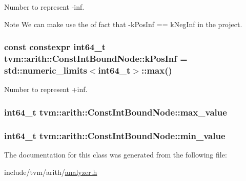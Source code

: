 Number to represent -\/inf. 

\begin{DoxyNote}{Note}
We can make use the of fact that -\/k\+Pos\+Inf == k\+Neg\+Inf in the project. 
\end{DoxyNote}
\subsubsection[{\texorpdfstring{k\+Pos\+Inf}{kPosInf}}]{\setlength{\rightskip}{0pt plus 5cm}const constexpr int64\+\_\+t tvm\+::arith\+::\+Const\+Int\+Bound\+Node\+::k\+Pos\+Inf = std\+::numeric\+\_\+limits$<$int64\+\_\+t$>$\+::{\bf max}()\hspace{0.3cm}{\ttfamily [static]}}\hypertarget{classtvm_1_1arith_1_1ConstIntBoundNode_a035f9270597638a44a55dd2552f4ad20}{}\label{classtvm_1_1arith_1_1ConstIntBoundNode_a035f9270597638a44a55dd2552f4ad20}


Number to represent +inf. 

\subsubsection[{\texorpdfstring{max\+\_\+value}{max_value}}]{\setlength{\rightskip}{0pt plus 5cm}int64\+\_\+t tvm\+::arith\+::\+Const\+Int\+Bound\+Node\+::max\+\_\+value}\hypertarget{classtvm_1_1arith_1_1ConstIntBoundNode_a7187224ffaf688dd1aa0f6069b393f92}{}\label{classtvm_1_1arith_1_1ConstIntBoundNode_a7187224ffaf688dd1aa0f6069b393f92}
\subsubsection[{\texorpdfstring{min\+\_\+value}{min_value}}]{\setlength{\rightskip}{0pt plus 5cm}int64\+\_\+t tvm\+::arith\+::\+Const\+Int\+Bound\+Node\+::min\+\_\+value}\hypertarget{classtvm_1_1arith_1_1ConstIntBoundNode_a0761897bf16ab73b848bf360e9b195a3}{}\label{classtvm_1_1arith_1_1ConstIntBoundNode_a0761897bf16ab73b848bf360e9b195a3}


The documentation for this class was generated from the following file\+:\begin{DoxyCompactItemize}
\item 
include/tvm/arith/\hyperlink{analyzer_8h}{analyzer.\+h}\end{DoxyCompactItemize}
